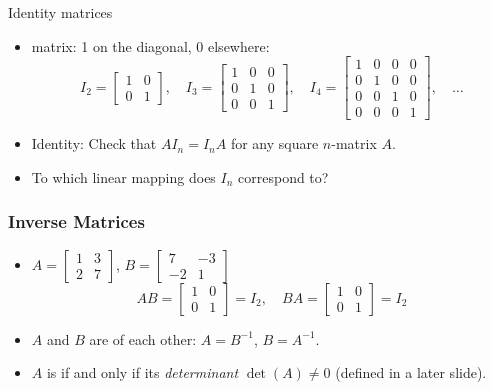 \documentclass[8pt,dvipsnames]{beamer}
\newcommand{\myemph}[1]{{\color{blue}{#1}}}
\begin{document}
  
\begin{frame}{Identity matrices}
  \begin{itemize}
  \item \myemph{Identity} matrix: 1 on the diagonal, 0 elsewhere: 
    $$
    I_2 =
    \begin{bmatrix}
      1 & 0\\
      0 & 1
    \end{bmatrix},\quad
    I_3 =
    \begin{bmatrix}
      1 & 0 & 0\\
      0 & 1  & 0\\
      0 & 0 & 1
    \end{bmatrix},\quad
    I_4 =
    \begin{bmatrix}
      1 & 0 & 0 & 0\\
      0 & 1 & 0 & 0\\
      0 & 0 & 1 & 0\\
      0 & 0 & 0 & 1
    \end{bmatrix},\quad \dots
    $$\vfill
  \item Identity: Check that $AI_n = I_nA$ for any square $n$-matrix $A$. \vfill
  \item To which linear mapping does $I_n$ correspond to?

  \end{itemize}
\end{frame}


\begin{frame}
  \frametitle{Inverse Matrices}
  \begin{itemize}
  \item $A =
    \begin{bmatrix}
      1 & 3\\ 2 & 7
    \end{bmatrix}
    $,
    $B =
    \begin{bmatrix}
    7 & -3 \\
    -2 & 1
    \end{bmatrix}
    $
    $$
    AB =
    \begin{bmatrix}
      1 & 0 \\0 & 1
    \end{bmatrix} = I_2,\quad BA =
    \begin{bmatrix}
      1 & 0\\
      0 & 1
    \end{bmatrix}
    = I_2
    $$\vfill
  \item  $A$ and $B$ are \myemph{inverse} of each other: $A = B^{-1}$, $B = A^{-1}$.\vfill
  \item $A$ is \myemph{invertible} if and only if its \emph{determinant} $\det(A) \not= 0$ (defined in a later slide).
  \end{itemize}
\end{frame}
\end{document}

